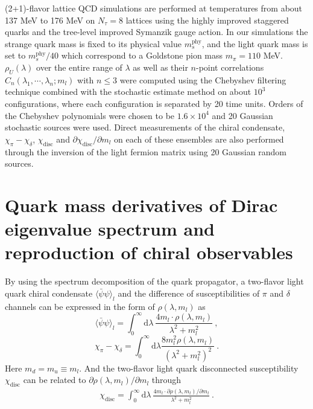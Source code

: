 \documentclass[a4paper,11pt]{article}
\numberwithin{equation}{section}
\begin{document}
 (2+1)-flavor lattice QCD simulations are performed at temperatures from about 137 MeV to 176 MeV on $N_{\tau}=8$ lattices using the highly improved staggered quarks and the tree-level improved Symanzik gauge action. 
In our simulations the strange quark mass is fixed to its physical value $m_s^{\text{phy}}$, and the light quark mass is set to $m_s^{\text{phy}}/40$ which correspond to a Goldstone pion mass $m_{\pi}=110$ MeV.
$\rho_U(\lambda)$ over the entire range of $\lambda$ as well as their $n$-point correlations $C_n(\lambda_1,\cdots,\lambda_n;m_l)$ with $n\leq3$ were computed using the Chebyshev filtering technique combined with the stochastic estimate method \cite{Ding:2020xlj, Zhang2020} on about $10^3$ configurations, where each configuration is separated by 20 time units.
Orders of the Chebyshev polynomials were chosen to be $1.6 \times10^4$ and 20 Gaussian stochastic sources were used. 
Direct measurements of the chiral condensate, $\chi_{\pi}-\chi_{\delta}$, $\chi_{\mathrm{disc}}$ and $\partial \chi_{\mathrm{disc}} / \partial m_l$ on each of these ensembles are also performed through the inversion of the light fermion matrix using 20 Gaussian random sources.








\section{Quark mass derivatives of Dirac eigenvalue spectrum and reproduction of chiral observables}



By using the spectrum decomposition of the quark propagator, a two-flavor light quark chiral condensate $\langle\bar{\psi} \psi\rangle_{l}$ and the difference of susceptibilities of $\pi$ and $\delta$ channels can be expressed in the form of $\rho(\lambda,m_l)$ as
\begin{equation}
\label{pbp_l}
\langle\bar{\psi} \psi\rangle_{l}
=\int_{0}^{\infty} \mathrm{d} \lambda~
\frac{4 m_{l} \cdot \rho\left(\lambda, m_{l}\right)}{\lambda^{2}+m_{l}^{2}} ~,
\end{equation}
\begin{equation}\label{chi_pi-chi_delta}
\chi_{\pi}-\chi_{\delta}
=\int_{0}^{\infty} \mathrm{d} \lambda \frac{8 m_{l}^{2} \rho(\lambda, m_l )}{(\lambda^{2}+m_{l}^{2})^{2}}~.
\end{equation}
Here $m_d=m_u\equiv m_l$. And the two-flavor light quark disconnected susceptibility $\chi_{\mathrm{disc}}$ can be related to $\partial \rho(\lambda,m_l ) / \partial m_{l}$ through
\begin{equation}
\begin{aligned}\label{chi_disc}
\chi_{\mathrm{disc}}=\int_{0}^{\infty} \mathrm{d} \lambda~
\frac{4 m_{l} \cdot \partial \rho\left(\lambda, m_{l}\right) / \partial m_{l}}{\lambda^{2}+m_{l}^{2}}~.
\end{aligned}
\end{equation}
\end{document}
